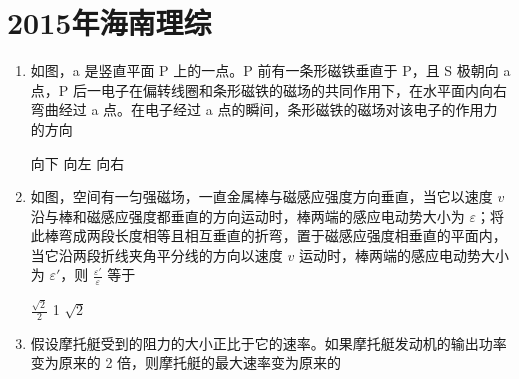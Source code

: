 \documentclass[\gkver]{gaokaozhenti}
\begin{document}
\chapter{2015年海南理综}

\begin{enumerate}
\item
如图，a 是竖直平面 P 上的一点。P 前有一条形磁铁垂直于 P，且 S 极朝向 a 点，P 后一电子在偏转线圈和条形磁铁的磁场的共同作用下，在水平面内向右弯曲经过 a 点。在电子经过 a 点的瞬间，条形磁铁的磁场对该电子的作用力的方向


{向下}
{向左}
{向右}


\item
如图，空间有一匀强磁场，一直金属棒与磁感应强度方向垂直，当它以速度 $v$ 沿与棒和磁感应强度都垂直的方向运动时，棒两端的感应电动势大小为 $\varepsilon$；将此棒弯成两段长度相等且相互垂直的折弯，置于磁感应强度相垂直的平面内，当它沿两段折线夹角平分线的方向以速度 $v$ 运动时，棒两端的感应电动势大小为 $\varepsilon'$，则 $\frac{\varepsilon'}{\varepsilon}$ 等于


{$\frac{\sqrt{2}}{2}$}
{1}
{$\sqrt{2}$}


\item
假设摩托艇受到的阻力的大小正比于它的速率。如果摩托艇发动机的输出功率变为原来的 2 倍，则摩托艇的最大速率变为原来的


\end{enumerate}
\end{document}
